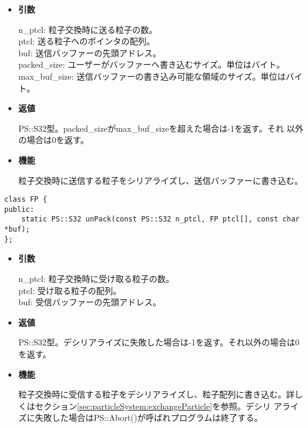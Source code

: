 \begin{itemize}

\item {\bf 引数}

  n\_ptcl: 粒子交換時に送る粒子の数。\\
  ptcl: 送る粒子へのポインタの配列。\\
  buf: 送信バッファーの先頭アドレス。\\
  packed\_size: ユーザーがバッファーへ書き込むサイズ。単位はバイト。\\
  max\_buf\_size: 送信バッファーの書き込み可能な領域のサイズ。単位はバイト。

\item {\bf 返値}

  PS::S32型。packed\_sizeがmax\_buf\_sizeを超えた場合は-1を返す。それ
  以外の場合は0を返す。
  
\item {\bf 機能}

 粒子交換時に送信する粒子をシリアライズし、送信バッファーに書き込む。

\end{itemize}



\begin{screen}
\begin{verbatim}
class FP {
public:
    static PS::S32 unPack(const PS::S32 n_ptcl, FP ptcl[], const char *buf);
};
\end{verbatim}
\end{screen}

\begin{itemize}

\item {\bf 引数}

  n\_ptcl: 粒子交換時に受け取る粒子の数。\\
  ptcl: 受け取る粒子の配列。\\
  buf: 受信バッファーの先頭アドレス。

\item {\bf 返値}

  PS::S32型。デシリアライズに失敗した場合は-1を返す。それ以外の場合は0
  を返す。

\item {\bf 機能}

 粒子交換時に受信する粒子をデシリアライズし、粒子配列に書き込む。詳し
 くはセクション\ref{sec:particleSystem:exchangeParticle}を参照。デシリ
 アライズに失敗した場合はPS::Abort()が呼ばれプログラムは終了する。

\end{itemize}
